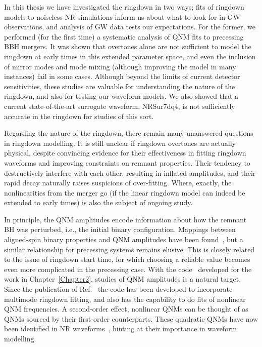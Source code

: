 \documentclass[
12pt, %
english, %
doublespacing, %
headsepline, %
]{MastersDoctoralThesis} %
\begin{document}
In this thesis we have investigated the ringdown in two ways; fits of ringdown models to noiseless NR simulations inform us about what to look for in GW observations, and analysis of GW data tests our expectations.
For the former, we performed (for the first time) a systematic analysis of QNM fits to precessing BBH mergers.
It was shown that overtones alone are not sufficient to model the ringdown at early times in this extended parameter space, and even the inclusion of mirror modes and mode mixing (although improving the model in many instances) fail in some cases.
Although beyond the limits of current detector sensitivities, these studies are valuable for understanding the nature of the ringdown, and also for testing our waveform models.
We also showed that a current state-of-the-art surrogate waveform, NRSur7dq4, is not sufficiently accurate in the ringdown for studies of this sort.

Regarding the nature of the ringdown, there remain many unanswered questions in ringdown modelling. 
It is still unclear if ringdown overtones are actually physical, despite convincing evidence for their effectiveness in fitting ringdown waveforms and improving constraints on remnant properties.
Their tendency to destructively interfere with each other, resulting in inflated amplitudes, and their rapid decay naturally raises suspicions of over-fitting.
Where, exactly, the nonlinearities from the merger go (if the linear ringdown model can indeed be extended to early times) is also the subject of ongoing study.

In principle, the QNM amplitudes encode information about how the remnant BH was perturbed, i.e., the initial binary configuration.
Mappings between aligned-spin binary properties and QNM amplitudes have been found~\cite{London:2014cma}, but a similar relationship for precessing systems remains elusive.
This is closely related to the issue of ringdown start time, for which choosing a reliable value becomes even more complicated in the precessing case.
With the code~\cite{qnmfits} developed for the work in Chapter~\ref{Chapter2}, studies of QNM amplitudes is a natural target.
Since the publication of Ref.~\cite{Finch:2021iip} the code has been developed to incorporate multimode ringdown fitting, and also has the capability to do fits of nonlinear QNM frequencies.
A second-order effect, nonlinear QNMs can be thought of as QNMs sourced by their first-order counterparts.
These quadratic QNMs have now been identified in NR waveforms~\cite{Cheung:2022rbm, Mitman:2022qdl}, hinting at their importance in waveform modelling.
\end{document}
